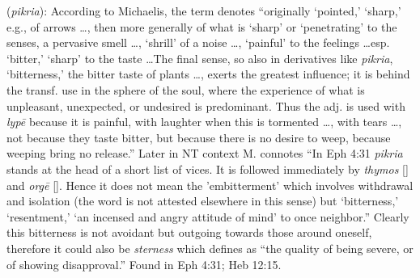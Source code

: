 \item[Bitterness,]

(\textit{pikria}):
According to Michaelis, the term denotes ``originally `pointed,' `sharp,' e.g., of arrows \ldots, then more generally of what is `sharp' or `penetrating' to the senses, a pervasive smell \ldots, `shrill' of a noise \ldots, `painful' to the feelings \ldots esp. `bitter,' `sharp' to the taste \ldots The final sense, so also in derivatives like \emph{pikria}, `bitterness,' the bitter taste of plants \ldots, exerts the greatest influence; it is behind the transf. use in the sphere of the soul, where the experience of what is unpleasant, unexpected, or undesired is predominant. Thus the adj. is used with \emph{lypē} because it is painful, with laughter when this is tormented \ldots, with tears \ldots, not because they taste bitter, but because there is no desire to weep, because weeping bring no release.''
Later in NT context M. connotes ``In Eph 4:31 \emph{pikria} stands at the head of a short list of vices. It is followed immediately by \emph{thymos} [] and \emph{orgē} []. Hence it does not mean the 'embitterment' which involves withdrawal and isolation (the word is not attested elsewhere in this sense) but `bitterness,' `resentment,' `an incensed and angry attitude of mind' to once neighbor.''
Clearly this bitterness is not avoidant but outgoing towards those around oneself, therefore it could also be \emph{sterness} which defines as ``the quality of being severe, or of showing disapproval.''
Found in Eph 4:31; Heb 12:15.

